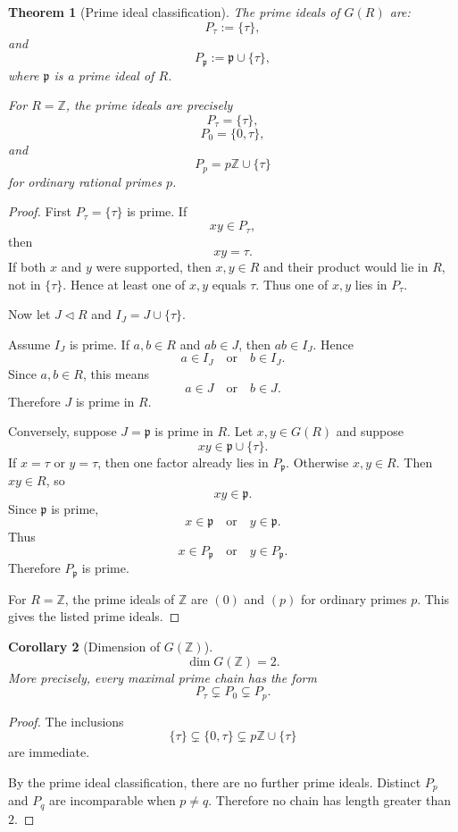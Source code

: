 \documentclass[11pt]{article}
\newtheorem{theorem}{Theorem}[section]
\newtheorem{corollary}[theorem]{Corollary}
\newcommand{\ZZ}{\mathbb Z}
\begin{document}
\begin{theorem}[Prime ideal classification]
The prime ideals of \(G(R)\) are:
\[
P_\tau:=\{\tau\},
\]
and
\[
P_{\mathfrak p}:=\mathfrak p\cup\{\tau\},
\]
where \(\mathfrak p\) is a prime ideal of \(R\).

For \(R=\ZZ\), the prime ideals are precisely
\[
P_\tau=\{\tau\},
\]
\[
P_0=\{0,\tau\},
\]
and
\[
P_p=p\ZZ\cup\{\tau\}
\]
for ordinary rational primes \(p\).
\end{theorem}

\begin{proof}
First \(P_\tau=\{\tau\}\) is prime. If
\[
xy\in P_\tau,
\]
then
\[
xy=\tau.
\]
If both \(x\) and \(y\) were supported, then \(x,y\in R\) and their product would lie in \(R\), not in \(\{\tau\}\). Hence at least one of \(x,y\) equals \(\tau\). Thus one of \(x,y\) lies in \(P_\tau\).

Now let \(J\triangleleft R\) and \(I_J=J\cup\{\tau\}\).

Assume \(I_J\) is prime. If \(a,b\in R\) and \(ab\in J\), then \(ab\in I_J\). Hence
\[
a\in I_J
\quad\text{or}\quad
b\in I_J.
\]
Since \(a,b\in R\), this means
\[
a\in J
\quad\text{or}\quad
b\in J.
\]
Therefore \(J\) is prime in \(R\).

Conversely, suppose \(J=\mathfrak p\) is prime in \(R\). Let \(x,y\in G(R)\) and suppose
\[
xy\in\mathfrak p\cup\{\tau\}.
\]
If \(x=\tau\) or \(y=\tau\), then one factor already lies in \(P_{\mathfrak p}\). Otherwise \(x,y\in R\). Then \(xy\in R\), so
\[
xy\in\mathfrak p.
\]
Since \(\mathfrak p\) is prime,
\[
x\in\mathfrak p
\quad\text{or}\quad
y\in\mathfrak p.
\]
Thus
\[
x\in P_{\mathfrak p}
\quad\text{or}\quad
y\in P_{\mathfrak p}.
\]
Therefore \(P_{\mathfrak p}\) is prime.

For \(R=\ZZ\), the prime ideals of \(\ZZ\) are \((0)\) and \((p)\) for ordinary primes \(p\). This gives the listed prime ideals.
\end{proof}

\begin{corollary}[Dimension of \(G(\ZZ)\)]
\[
\dim G(\ZZ)=2.
\]
More precisely, every maximal prime chain has the form
\[
P_\tau\subsetneq P_0\subsetneq P_p.
\]
\end{corollary}

\begin{proof}
The inclusions
\[
\{\tau\}\subsetneq\{0,\tau\}\subsetneq p\ZZ\cup\{\tau\}
\]
are immediate.

By the prime ideal classification, there are no further prime ideals. Distinct \(P_p\) and \(P_q\) are incomparable when \(p\neq q\). Therefore no chain has length greater than \(2\).
\end{proof}
\end{document}
